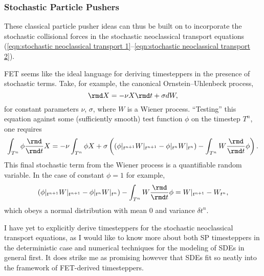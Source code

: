 \subsubsection{Stochastic Particle Pushers}
    These classical particle pusher ideas can thus be built on to incorporate the stochastic collisional forces in the stochastic neoclassical transport equations (\ref{eqn:stochastic neoclassical transport 1}--\ref{eqn:stochastic neoclassical transport 2}).

    \begin{remark}
        FET seems like the ideal language for deriving timesteppers in the presence of stochastic terms. Take, for example, the canonical Ornstein--Uhlenbeck process,
        \begin{equation}
            \rmd X  =  - \nu X\rmd t + \sigma dW,
        \end{equation}
        for constant parameters $\nu$, $\sigma$, where $W$ is a Wiener process. ``Testing'' this equation against some (sufficiently smooth) test function $\phi$ on the timestep $T^{n}$, one requires
        \begin{equation}
            \int_{T^{n}}\phi\frac{\rmd}{\rmd t}X  =  - \nu\int_{T^{n}}\phi X + \sigma\left(\left(\phi|_{t^{n + 1}}W|_{t^{n + 1}} - \phi|_{t^{n}}W|_{t^{n}}\right) - \int_{T^{n}}W\frac{\rmd}{\rmd t}\phi\right).
        \end{equation}
        This final stochastic term from the Wiener process is a quantifiable random variable. In the case of constant $\phi = 1$ for example,
        \begin{equation}
            \left(\phi|_{t^{n + 1}}W|_{t^{n + 1}} - \phi|_{t^{n}}W|_{t^{n}}\right) - \int_{T^{n}}W\frac{\rmd}{\rmd t}\phi
            =  W|_{t^{n + 1}} - W_{t^{n}},
        \end{equation}
        which obeys a normal distribution with mean $0$ and variance $\delta t^{n}$.

        I have yet to explicitly derive timesteppers for the stochastic neoclassical transport equations, as I would like to know more about both SP timesteppers in the deterministic case and numerical techniques for the modeling of SDEs in general first. It does strike me as promising however that SDEs fit so neatly into the framework of FET-derived timesteppers.
    \end{remark}

    
    
    
    
